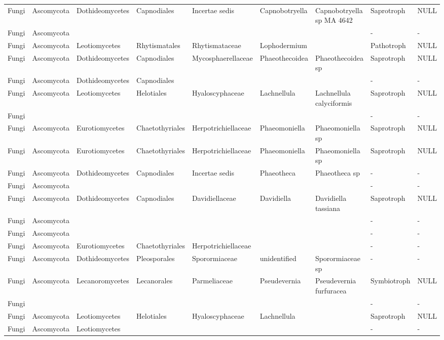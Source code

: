 \documentclass[12pt]{article}\usepackage[]{graphicx}\usepackage[]{color}
\numberwithin{figure}{section}
\begin{document}
\begin{landscape}
\begin{table}[ht]
\begin{tabular}{lllllllll}
  Fungi & Ascomycota & Dothideomycetes & Capnodiales & Incertae sedis & Capnobotryella & Capnobotryella sp MA 4642 & Saprotroph & NULL \\ 
  Fungi & Ascomycota &  &  &  &  &  & - & - \\ 
  Fungi & Ascomycota & Leotiomycetes & Rhytismatales & Rhytismataceae & Lophodermium &  & Pathotroph & NULL \\ 
  Fungi & Ascomycota & Dothideomycetes & Capnodiales & Mycosphaerellaceae & Phaeothecoidea & Phaeothecoidea sp & Saprotroph & NULL \\ 
  Fungi & Ascomycota & Dothideomycetes & Capnodiales &  &  &  & - & - \\ 
  Fungi & Ascomycota & Leotiomycetes & Helotiales & Hyaloscyphaceae & Lachnellula & Lachnellula calyciformis & Saprotroph & NULL \\ 
  Fungi &  &  &  &  &  &  & - & - \\ 
  Fungi & Ascomycota & Eurotiomycetes & Chaetothyriales & Herpotrichiellaceae & Phaeomoniella & Phaeomoniella sp & Saprotroph & NULL \\ 
  Fungi & Ascomycota & Eurotiomycetes & Chaetothyriales & Herpotrichiellaceae & Phaeomoniella & Phaeomoniella sp & Saprotroph & NULL \\ 
  Fungi & Ascomycota & Dothideomycetes & Capnodiales & Incertae sedis & Phaeotheca & Phaeotheca sp & - & - \\ 
  Fungi & Ascomycota &  &  &  &  &  & - & - \\ 
  Fungi & Ascomycota & Dothideomycetes & Capnodiales & Davidiellaceae & Davidiella & Davidiella tassiana & Saprotroph & NULL \\ 
  Fungi & Ascomycota &  &  &  &  &  & - & - \\ 
  Fungi & Ascomycota &  &  &  &  &  & - & - \\ 
  Fungi & Ascomycota & Eurotiomycetes & Chaetothyriales & Herpotrichiellaceae &  &  & - & - \\ 
  Fungi & Ascomycota & Dothideomycetes & Pleosporales & Sporormiaceae & unidentified & Sporormiaceae sp & - & - \\ 
  Fungi & Ascomycota & Lecanoromycetes & Lecanorales & Parmeliaceae & Pseudevernia & Pseudevernia furfuracea & Symbiotroph & NULL \\ 
  Fungi &  &  &  &  &  &  & - & - \\ 
  Fungi & Ascomycota & Leotiomycetes & Helotiales & Hyaloscyphaceae & Lachnellula &  & Saprotroph & NULL \\ 
  Fungi & Ascomycota & Leotiomycetes &  &  &  &  & - & - \\ 

\end{tabular}
\end{table}
\end{landscape}
\end{document}

